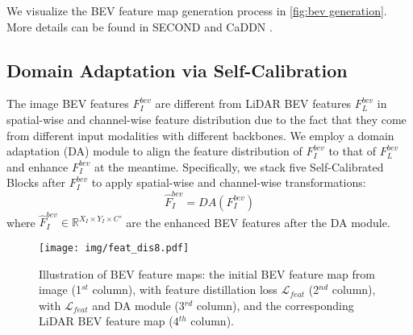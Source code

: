 \documentclass[runningheads]{llncs}
\begin{document}
We visualize the BEV feature map generation process in \cref{fig:bev generation}. 
More details can be found in SECOND \cite{second} and CaDDN \cite{CADDN}.

\subsection{Domain Adaptation via Self-Calibration}
The image BEV features $F^{bev}_{I}$ are different from LiDAR BEV features $F^{bev}_{L}$ in spatial-wise and channel-wise feature distribution due to the fact that they come from different input modalities with different backbones. 
We employ a domain adaptation (DA) module to align the feature distribution of $F^{bev}_{I}$ to that of $F^{bev}_{L}$ and enhance $F^{bev}_{I}$ at the meantime.
Specifically, we stack five Self-Calibrated Blocks \cite{scnet} after $F^{bev}_{I}$ to apply spatial-wise and channel-wise transformations:
\begin{equation}
   \hat{F}^{bev}_{I} = DA(F^{bev}_{I})
\end{equation}
where $\hat{F}^{bev}_{I}\in \mathbb{R}^{X_I \times Y_I \times C'}$ are the enhanced BEV features after the DA module.


\begin{figure}[t]
  \centering
   \texttt{[image: img/feat\_dis8.pdf]}
   \caption{Illustration of BEV feature maps: the initial BEV feature map from image (1$^{st}$ column), with feature distillation loss $\mathcal{L}_{feat}$ (2$^{nd}$ column), with $\mathcal{L}_{feat}$ and DA module (3$^{rd}$ column), and the corresponding LiDAR BEV feature map (4$^{th}$ column).
}
   \label{fig:featuer distillation}
\end{figure}
\end{document}
